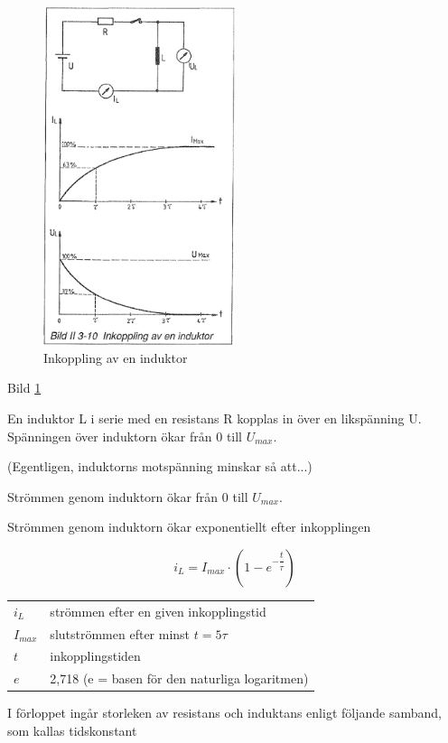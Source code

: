 \begin{figure}
\includegraphics[width=0.5\textwidth]{images/bild_2_3-10}
\caption{Inkoppling av en induktor}
\label{fig:BildII3-10}
\end{figure}

Bild \ref{fig:BildII3-10}

En induktor L i serie med en resistans R kopplas in över en likspänning U.
Spänningen över induktorn ökar från 0 till \(U_{max}\).

(Egentligen, induktorns motspänning minskar så att...)

Strömmen genom induktorn ökar från 0 till \(U_{max}\).

Strömmen genom induktorn ökar exponentiellt efter inkopplingen

\[i_L = I_{max} \cdot (1-e^{-\dfrac{t}{\tau}} )\]

\begin{tabular}{lp{}}
  \(i_L\) &  strömmen efter en given inkopplingstid \\
  \(I_{max}\) & slutströmmen efter minst \(t = 5\tau\) \\
  \(t\) & inkopplingstiden \\
  \(e\) & 2,718 (e = basen för den naturliga logaritmen) \\
\end{tabular}

I förloppet ingår storleken av resistans och induktans enligt följande samband,
som kallas tidskonstant

